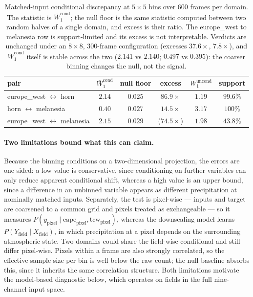 \documentclass{article}
\begin{document}
\begin{table}[t]
\centering
\small
\begin{tabular}{lccccc}
\toprule
pair & $\overline{W}_1^{\text{cond}}$ & null floor & excess &
$W_1^{\text{uncond}}$ & support \\
\midrule
europe\_west $\leftrightarrow$ horn & $2.14$ & $0.025$ & $86.9\times$ &
$1.19$ & $99.6\%$ \\
horn $\leftrightarrow$ melanesia & $0.40$ & $0.027$ & $14.5\times$ &
$3.17$ & $100\%$ \\
europe\_west $\leftrightarrow$ melanesia & $2.15$ & $0.029$ &
($74.5\times$) & $1.98$ & $43.8\%$ \\
\bottomrule
\end{tabular}
\caption{Matched-input conditional discrepancy at $5\times5$ bins over
$600$ frames per domain. The statistic is
$\overline{W}_1^{\text{cond}}$; the null floor is the same statistic
computed between two random halves of a single domain, and excess is
their ratio. The europe\_west to melanesia row is support-limited and
its excess is not interpretable. Verdicts are unchanged under an
$8\times8$, $300$-frame configuration (excesses $37.6\times$,
$7.8\times$), and $\overline{W}_1^{\text{cond}}$ itself is stable
across the two ($2.141$ vs $2.140$; $0.497$ vs $0.395$): the coarser
binning changes the null, not the signal.}
\label{tab:matched_input}
\end{table}

\paragraph{Two limitations bound what this can claim.}
Because the binning conditions on a two-dimensional projection, the
errors are one-sided: a low value is conservative, since conditioning
on further variables can only reduce apparent conditional shift,
whereas a high value is an upper bound, since a difference in an
unbinned variable appears as different precipitation at nominally
matched inputs. Separately, the test is pixel-wise --- inputs and
target are coarsened to a common grid and pixels treated as
exchangeable --- so it measures $P(y_{\text{pixel}}\mid
\text{cape}_{\text{pixel}}, \text{tcw}_{\text{pixel}})$, whereas the
downscaling model learns $P(Y_{\text{field}}\mid X_{\text{field}})$, in
which precipitation at a pixel depends on the surrounding atmospheric
state. Two domains could share the field-wise conditional and still
differ pixel-wise. Pixels within a frame are also strongly correlated,
so the effective sample size per bin is well below the raw count; the
null baseline absorbs this, since it inherits the same correlation
structure. Both limitations motivate the model-based diagnostic below,
which operates on fields in the full nine-channel input space.
\end{document}
